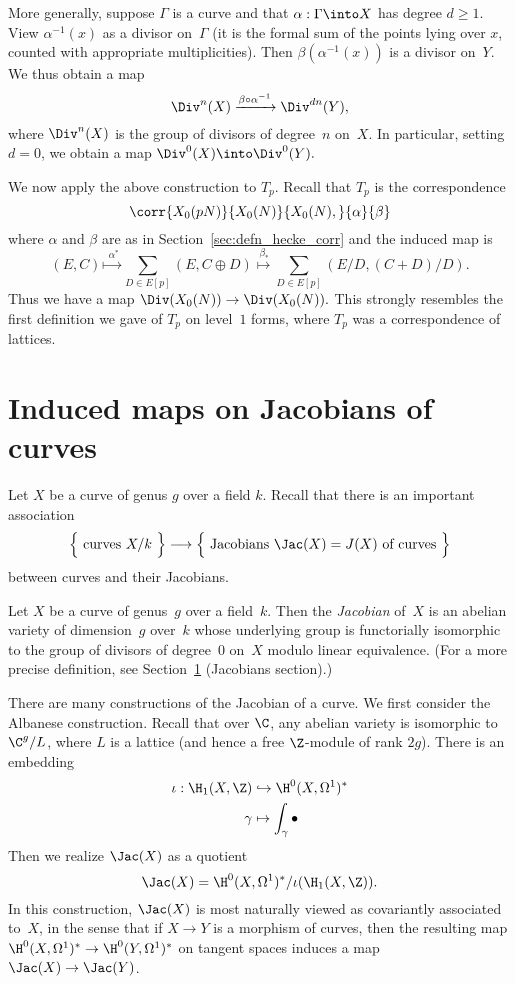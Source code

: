 \documentclass{report}
\begin{document}
More generally, suppose $\Gamma$ is a curve and
that $\alpha:\Gamma\into X$ has degree $d\geq 1$.
View $\alpha^{-1}(x)$ as a divisor on~$\Gamma$ (it is the formal sum
of the points lying over $x$, counted with appropriate multiplicities).
Then $\beta(\alpha^{-1}(x))$ is a divisor on~$Y$. We thus obtain a map
\[
 \Div^n(X)\xrightarrow{\beta\circ\alpha^{-1}}\Div^{dn}(Y),
\]
where $\Div^n(X)$ is the group of divisors of degree~$n$ on~$X$.
In particular, setting $d=0$, we obtain a map $\Div^0(X)\into \Div^0(Y).$

We now apply the above construction to $T_p$.
Recall that $T_p$ is the correspondence
\[
  \corr{X_0(pN)}{X_0(N)}{X_0(N),}{\alpha}{\beta}
\]
where $\alpha$ and $\beta$ are as in
Section~\ref{sec:defn_hecke_corr} and the induced map is
\[
  (E,C)\stackrel{\,\,\alpha^*}{\mapsto}\sum_{D\in E[p]}(E,C\oplus D)
       \stackrel{\,\beta_*}{\mapsto}\sum_{D\in E[p]}(E/D,(C+D)/D).
\]
Thus we have a map $\Div(X_0(N))\to \Div(X_0(N)).$
This strongly resembles the first definition we gave of $T_p$ on
level~$1$ forms, where $T_p$ was a correspondence
of lattices.

\section{Induced maps on Jacobians of curves}
Let $X$ be a curve of genus $g$ over a field $k$.
Recall that there is an important association
\[
 \Bigl\{\text{ curves $X/k$ }\Bigr\} \longrightarrow
  \Bigl\{\text{ Jacobians $\Jac(X)=J(X)$ of curves }\Bigr\}
\]
between curves and their Jacobians.

\begin{definition}[Jacobian]
Let $X$ be a curve of genus~$g$ over a field~$k$.  Then the {\em Jacobian} of~$X$ is an abelian
variety of dimension~$g$ over~$k$ whose underlying group is functorially isomorphic to
the group of divisors of degree~$0$ on~$X$ modulo linear equivalence.  (For a more precise
definition, see Section~\ref{} (Jacobians section).)
\end{definition}

There are many constructions of the Jacobian of a curve.  We first
consider the Albanese construction. Recall that
over $\C$, any abelian variety is isomorphic to $\C^g/L$, where
$L$ is a lattice (and hence a free $\Z$-module of rank $2g$).
There is an embedding
\begin{align*}
  \iota:\H_1(X,\Z)&\hookrightarrow \H^0(X,\Omega^1)^{*}\\
  \gamma&\mapsto\int_{\gamma} \bullet
\end{align*}
Then we realize $\Jac(X)$ as a quotient
\[
  \Jac(X)=\H^0(X,\Omega^1)^{*}/\iota(\H_1(X,\Z)).
\]
In this construction, $\Jac(X)$ is most naturally viewed as
covariantly associated to~$X$, in the
sense that if $X\to Y$ is a morphism of curves, then the resulting map
 $\H^0(X,\Omega^1)^{*}\to \H^0(Y,\Omega^1)^*$ on
tangent spaces induces a map $\Jac(X)\to \Jac(Y)$.
\end{document}
